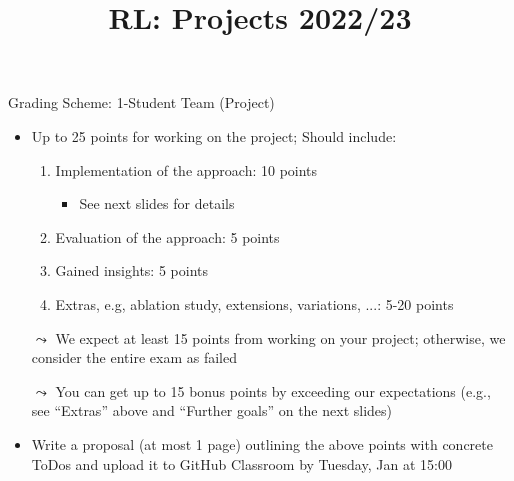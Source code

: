 \documentclass[aspectratio=169]{../latex_main/tntbeamer}  %
\title[Conclusion]{RL: Projects 2022/23}
\subtitle{}
\begin{document}
	
	\maketitle


\begin{frame}[c]{Grading Scheme: 1-Student Team (Project)}
 
	\begin{itemize}
		\item Up to 25 points for working on the project; Should include:
        \begin{enumerate}
            \item Implementation of the approach: 10 points
            \begin{itemize}
                \item See next slides for details
            \end{itemize}
            \item Evaluation of the approach: 5 points
            \item Gained insights: 5 points
            \item Extras, e.g, ablation study, extensions, variations, ...: 5-20 points
        \end{enumerate}
            \item[$\leadsto$] We expect at least 15 points from working on your project; otherwise, we consider the entire exam as failed
            \item[$\leadsto$] You can get up to 15 bonus points by exceeding our expectations (e.g., see ``Extras'' above and ``Further goals'' on the next slides)
            \item \alert{Write a proposal (at most 1 page) outlining the above points with concrete ToDos and upload it to GitHub Classroom by Tuesday, Jan  at 15:00}
        \end{itemize}
        
\end{frame}
\end{document}
